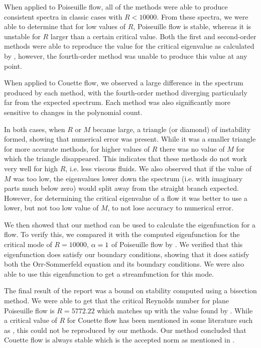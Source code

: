 When applied to Poiseuille flow, all of the methods were able to produce consistent spectra in classic cases with $R< 10000$. From these spectra, we were able to determine that for low values of $R$, Poiseuille flow is stable, whereas it is unstable for $R$ larger than a certain critical value. Both the first and second-order methods were able to reproduce the value for the critical eigenvalue as calculated by \citet{orszag1971accurate}, however, the fourth-order method was unable to produce this value at any point.

When applied to Couette flow, we observed a large difference in the spectrum produced by each method, with the fourth-order method diverging particularly far from the expected spectrum. Each method was also significantly more sensitive to changes in the polynomial count.

In both cases, when $R$ or $M $ became large, a triangle (or diamond) of instability formed, showing that numerical error was present. While it was a smaller triangle for more accurate methods, for higher values of $R$ there was no value of $M$ for which the triangle disappeared. This indicates that these methods do not work very well for high $R$, i.e. less viscous fluids. We also observed that if the value of $M $ was too low, the eigenvalues lower down the spectrum (i.e. with imaginary parts much below zero) would split away from the straight branch expected. However, for determining the critical eigenvalue of a flow it was better to use a lower, but not too low value of $M$, to not lose accuracy to numerical error.

We then showed that our method can be used to calculate the eigenfunction for a flow. To verify this, we compared it with the computed eigenfunction for the critical mode of $R = 10000$, $ \alpha = 1$ of Poiseuille flow by \citet{thomas1953stability}. We verified that this eigenfunction does satisfy our boundary conditions, showing that it does satisfy both the Orr-Sommerfeld equation and its boundary conditions. We were also able to use this eigenfunction to get a streamfunction for this mode.

The final result of the report was a bound on stability computed using a bisection method. We were able to get that the critical Reynolds number for plane Poiseuille flow is $ R = 5772.22$ which matches up with the value found by \citet{orszag1971accurate}. While a critical value of $R$ for Couette flow has been mentioned in some literature such as \citet{bukhari1997spectral}, this could not be reproduced by our methods. Our method concluded that Couette flow is always stable which is the accepted norm as mentioned in \citet{trefethen1993hydrodynamic}.

